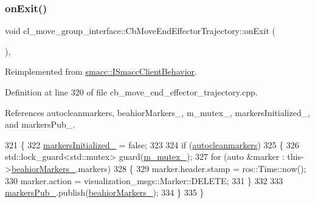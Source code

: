\subsubsection{\texorpdfstring{on\+Exit()}{onExit()}}
{\footnotesize\ttfamily void cl\+\_\+move\+\_\+group\+\_\+interface\+::\+Cb\+Move\+End\+Effector\+Trajectory\+::on\+Exit (\begin{DoxyParamCaption}{ }\end{DoxyParamCaption})\hspace{0.3cm}{\ttfamily [override]}, {\ttfamily [virtual]}}



Reimplemented from \hyperlink{classsmacc_1_1ISmaccClientBehavior_ad1198fdb2cbdf11f3276d3e23d4c0a50}{smacc\+::\+I\+Smacc\+Client\+Behavior}.



Definition at line 320 of file cb\+\_\+move\+\_\+end\+\_\+effector\+\_\+trajectory.\+cpp.



References autocleanmarkers, beahior\+Markers\+\_\+, m\+\_\+mutex\+\_\+, markers\+Initialized\+\_\+, and markers\+Pub\+\_\+.


\begin{DoxyCode}
321     \{
322         \hyperlink{classcl__move__group__interface_1_1CbMoveEndEffectorTrajectory_ac140a7f0adfb20f1e2900a5c8cd2ca5b}{markersInitialized\_} = \textcolor{keyword}{false};
323 
324         \textcolor{keywordflow}{if} (\hyperlink{classcl__move__group__interface_1_1CbMoveEndEffectorTrajectory_a790c30b94509dc6f4d0064f6356a04db}{autocleanmarkers})
325         \{
326             std::lock\_guard<std::mutex> guard(\hyperlink{classcl__move__group__interface_1_1CbMoveEndEffectorTrajectory_a2a98ef725cb3fc7f61654d3d6a2066bb}{m\_mutex\_});
327             \textcolor{keywordflow}{for} (\textcolor{keyword}{auto} &marker : this->\hyperlink{classcl__move__group__interface_1_1CbMoveEndEffectorTrajectory_a809fb5385adf27c0a1c8f8136566949c}{beahiorMarkers\_}.markers)
328             \{
329                 marker.header.stamp = ros::Time::now();
330                 marker.action = visualization\_msgs::Marker::DELETE;
331             \}
332 
333             \hyperlink{classcl__move__group__interface_1_1CbMoveEndEffectorTrajectory_aabc2216b2d8625fecd83c5ec69928e63}{markersPub\_}.publish(\hyperlink{classcl__move__group__interface_1_1CbMoveEndEffectorTrajectory_a809fb5385adf27c0a1c8f8136566949c}{beahiorMarkers\_});
334         \}
335     \}
\end{DoxyCode}
\mbox{\label{classcl__move__group__interface_1_1CbMoveEndEffectorTrajectory_aae4797fba54cb3bf371cc67d26a82186}} 
